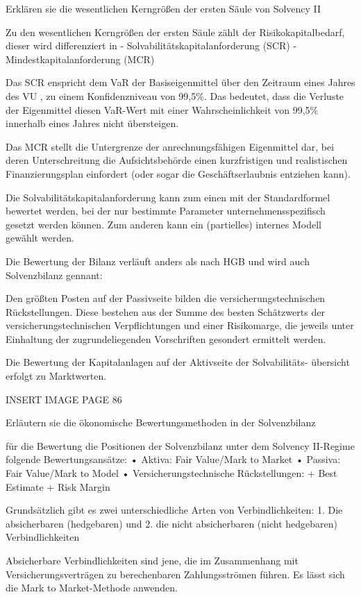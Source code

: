 Erklären sie die wesentlichen Kerngrößen der ersten Säule von Solvency II


Zu den wesentlichen Kerngrößen der ersten Säule zählt der Risikokapitalbedarf, dieser wird differenziert in 
- Solvabilitätskapitalanforderung (SCR)
- Mindestkapitalanforderung (MCR)

Das SCR enspricht dem VaR der Basiseigenmittel über den Zeitraum eines Jahres des VU ,
zu einem Konfidenzniveau von 99,5\%.
Das bedeutet, dass die Verluste der Eigenmittel
diesen VaR-Wert mit einer Wahrscheinlichkeit von 99,5\% innerhalb eines Jahres nicht übersteigen.

Das MCR stellt die Untergrenze der anrechnungsfähigen
Eigenmittel dar, bei deren Unterschreitung die Aufsichtsbehörde einen kurzfristigen und
realistischen Finanzierungsplan einfordert (oder sogar die Geschäftserlaubnis entziehen kann).

Die Solvabilitätskapitalanforderung kann zum einen mit der Standardformel bewertet
werden, bei der nur bestimmte Parameter unternehmensspezifisch gesetzt werden können.
Zum anderen kann ein (partielles) internes Modell gewählt werden.

Die Bewertung der Bilanz verläuft anders als nach HGB und wird auch Solvenzbilanz gennant:

Den größten Posten auf der Passivseite bilden die versicherungstechnischen Rückstellungen. 
Diese bestehen aus der Summe des besten Schätzwerts der versicherungstechnischen Verpflichtungen und einer
Risikomarge, die jeweils unter Einhaltung der zugrundeliegenden Vorschriften gesondert
ermittelt werden.

Die Bewertung der Kapitalanlagen auf der Aktivseite der Solvabilitäts-
übersicht erfolgt zu Marktwerten.

INSERT IMAGE PAGE 86


Erläutern sie die ökonomische Bewertungsmethoden in der Solvenzbilanz

für die Bewertung die Positionen der Solvenzbilanz unter dem Solvency
II-Regime folgende Bewertungsansätze:
• Aktiva: Fair Value/Mark to Market
• Passiva: Fair Value/Mark to Model
• Versicherungstechnische Rückstellungen:
+ Best Estimate
+ Risk Margin

Grundsätzlich gibt es zwei unterschiedliche Arten von Verbindlichkeiten:
1. Die absicherbaren (hedgebaren) und
2. die nicht absicherbaren (nicht hedgebaren) Verbindlichkeiten

Absicherbare Verbindlichkeiten sind jene, die im Zusammenhang mit Versicherungsverträgen zu
berechenbaren Zahlungsströmen führen. Es lässt sich die Mark to Market-Methode anwenden.

